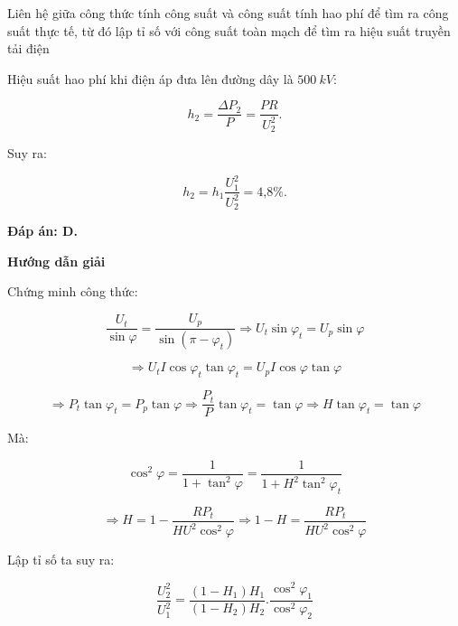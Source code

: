 \begin{dang}{Liên hệ giữa công thức tính công suất và công suất tính hao phí để tìm ra công suất thực tế, từ đó lập tỉ số với công suất toàn mạch để tìm ra hiệu suất truyền tải điện}
{		Hiệu suất hao phí khi điện áp đưa lên đường dây là $\SI{500}{kV}$:
		
		$$h_2 =\dfrac{\Delta P_2}{P} = \dfrac{PR}{U^2_2}.$$
		
		Suy ra:
		
		$$h_2 = h_1 \dfrac{U^2_1}{U^2_2} = \text{4,8}\%.$$
		
		\textbf{Đáp án: D.}
	}
	
	{\begin{center}
			\textbf{Hướng dẫn giải}
		\end{center}
		
		Chứng minh công thức:
		
		$$\dfrac{{{U}_{t}}}{\sin \varphi }=\dfrac{{{U}_{p}}}{\sin \left( \pi -{{\varphi }_{t}} \right)}\Rightarrow {{U}_{t}}\sin {{\varphi }_{t}}={{U}_{p}}\sin \varphi$$
		
		$$\Rightarrow {{U}_{t}}I\cos {{\varphi }_{t}}\tan {{\varphi }_{t}}={{U}_{p}}I\cos \varphi \tan \varphi$$
		
		$$\Rightarrow {{P}_{t}}\tan {{\varphi }_{t}}={{P}_{p}}\tan \varphi \Rightarrow \dfrac{{{P}_{t}}}{P}\tan {{\varphi }_{t}}=\tan \varphi\Rightarrow H\tan {{\varphi }_{t}}=\tan \varphi$$
		
		Mà:
		
		$${{\cos }^{2}}\varphi =\dfrac{1}{1+{{\tan }^{2}}\varphi }=\dfrac{1}{1+{{H}^{2}}{{\tan }^{2}}{{\varphi }_{t}}}$$
		
		$$\Rightarrow H=1-\dfrac{R{{P}_{t}}}{H{{U}^{2}}{{\cos }^{2}}\varphi }\Rightarrow 1-H=\dfrac{R{{P}_{t}}}{H{{U}^{2}}{{\cos }^{2}}\varphi }$$
		
		Lập tỉ số ta suy ra:
		
		$$\dfrac{U_{2}^{2}}{U_{1}^{2}}=\dfrac{(1-{{H}_{1}}){{H}_{1}}}{(1-{{H}_{2}}){{H}_{2}}}.\dfrac{{{\cos }^{2}}{{\varphi }_{1}}}{{{\cos }^{2}}{{\varphi }_{2}}}$$
		
}
\end{dang}
